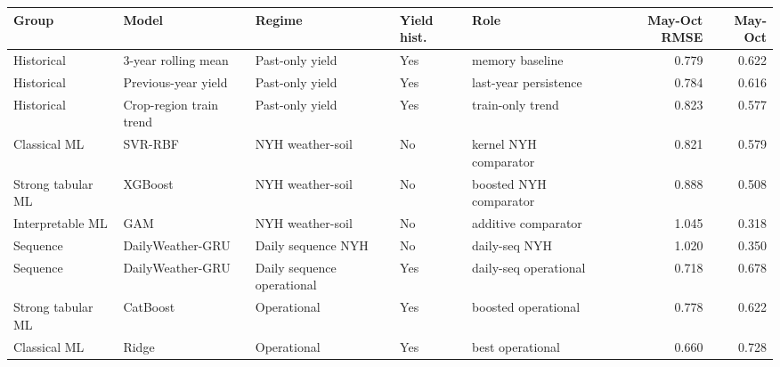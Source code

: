 \begin{tabular}{lllllrr}
\toprule
Group & Model & Regime & Yield hist. & Role & May-Oct RMSE & May-Oct \Rsq{} \\
\midrule
Historical & 3-year rolling mean & Past-only yield & Yes & memory baseline & 0.779 & 0.622 \\
Historical & Previous-year yield & Past-only yield & Yes & last-year persistence & 0.784 & 0.616 \\
Historical & Crop-region train trend & Past-only yield & Yes & train-only trend & 0.823 & 0.577 \\
Classical ML & SVR-RBF & NYH weather-soil & No & kernel NYH comparator & 0.821 & 0.579 \\
Strong tabular ML & XGBoost & NYH weather-soil & No & boosted NYH comparator & 0.888 & 0.508 \\
Interpretable ML & GAM & NYH weather-soil & No & additive comparator & 1.045 & 0.318 \\
Sequence & DailyWeather-GRU & Daily sequence NYH & No & daily-seq NYH & 1.020 & 0.350 \\
Sequence & DailyWeather-GRU & Daily sequence operational & Yes & daily-seq operational & 0.718 & 0.678 \\
Strong tabular ML & CatBoost & Operational & Yes & boosted operational & 0.778 & 0.622 \\
Classical ML & Ridge & Operational & Yes & best operational & 0.660 & 0.728 \\
\bottomrule
\end{tabular}
